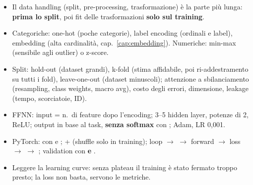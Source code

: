 \begin{sintesi}
\begin{itemize}
  \item Il data handling (split, pre-processing, trasformazione) è la parte più lunga: \textbf{prima lo split}, poi fit delle
        trasformazioni \textbf{solo sul training}.
  \item Categoriche: one-hot (poche categorie), label encoding (ordinali e label), embedding (alta cardinalità, cap.~\ref{cap:embedding}).
        Numeriche: min-max (sensibile agli outlier) o z-score.
  \item Split: hold-out (dataset grandi), k-fold (stima affidabile, poi ri-addestramento su tutti i fold), leave-one-out (dataset minuscoli);
        attenzione a sbilanciamento (resampling, class weights, macro avg), costo degli errori, dimensione, leakage (tempo, scorciatoie, ID).
  \item FFNN: input = n.\ di feature dopo l'encoding; 3--5 hidden layer, potenze di 2, ReLU; output in base al task, \textbf{senza softmax}
        con ; Adam, LR 0,001.
  \item PyTorch:  con  e ;  +  (shuffle solo in training);
        loop  $\to$  $\to$ forward $\to$ loss $\to$  $\to$ ; validation con
         \textbf{e} .
  \item Leggere la learning curve: senza plateau il training è stato fermato troppo presto; la loss non basta, servono le metriche.
\end{itemize}
\end{sintesi}
